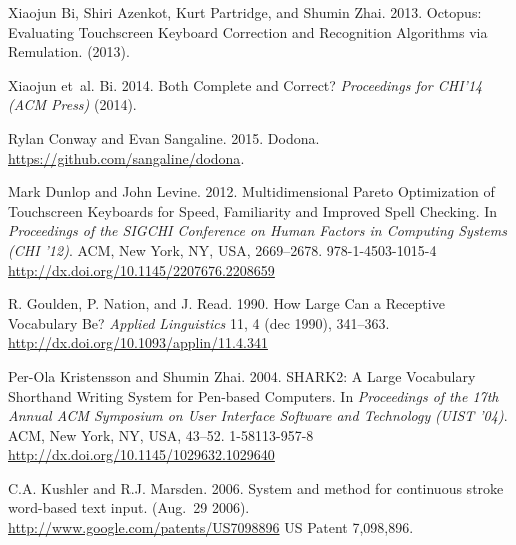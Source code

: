 \documentclass[final,1p,times,authoryear]{elsarticle}
\begin{document}
\begin{thebibliography}{00}
{Xiaojun Bi}, {Shiri Azenkot}, {Kurt Partridge}, {and} {Shumin Zhai}. 2013.
Octopus: Evaluating Touchscreen Keyboard Correction and Recognition
  Algorithms via Remulation.
(2013).
\newblock


{Xiaojun et~al. Bi}. 2014.
Both Complete and Correct?
{\em Proceedings for CHI'14 (ACM Press)\/} (2014).
\newblock


{Rylan Conway} {and} {Evan Sangaline}. 2015.
Dodona.\\
\url{https://github.com/sangaline/dodona}. 
\newblock


{Mark Dunlop} {and} {John Levine}. 2012.
Multidimensional Pareto Optimization of Touchscreen
  Keyboards for Speed, Familiarity and Improved Spell Checking. In {\em
  Proceedings of the SIGCHI Conference on Human Factors in Computing Systems}
  {\em (CHI '12)}. ACM, New York, NY, USA, 2669--2678.
978-1-4503-1015-4
\url{http://dx.doi.org/10.1145/2207676.2208659}


{R. Goulden}, {P. Nation}, {and} {J. Read}. 1990.
How Large Can a Receptive Vocabulary Be?
{\em Applied Linguistics\/} {11}, 4 (dec 1990), 341--363.
\url{http://dx.doi.org/10.1093/applin/11.4.341}


{Per-Ola Kristensson} {and} {Shumin Zhai}. 2004.
SHARK2: A Large Vocabulary Shorthand Writing System
  for Pen-based Computers. In {\em Proceedings of the 17th Annual ACM
  Symposium on User Interface Software and Technology} {\em (UIST '04)}. ACM,
  New York, NY, USA, 43--52.
1-58113-957-8\\
\url{http://dx.doi.org/10.1145/1029632.1029640}


{C.A. Kushler} {and} {R.J. Marsden}. 2006.
System and method for continuous stroke word-based text input.
(Aug.~29 2006).
\url{http://www.google.com/patents/US7098896}
US Patent 7,098,896.



\end{thebibliography}
\end{document}
